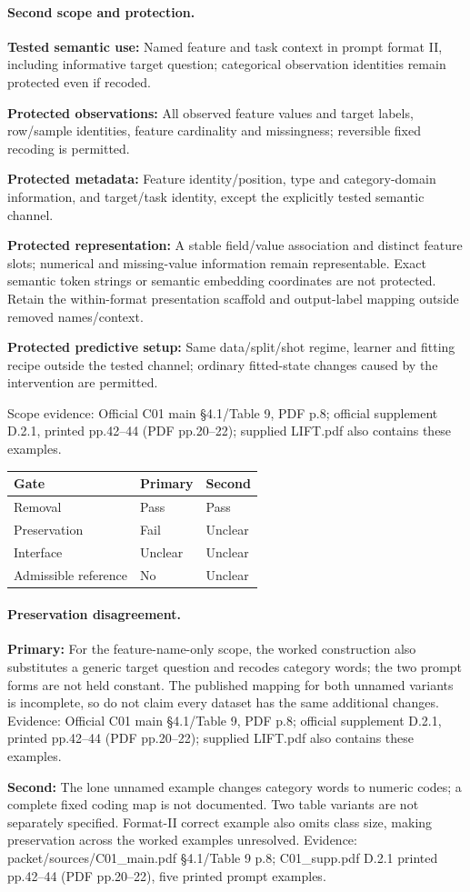 \documentclass[10pt]{article}
\begin{document}
\paragraph{Second scope and protection.}
\textbf{Tested semantic use:} Named feature and task context in prompt format II, including informative target question; categorical observation identities remain protected even if recoded.\par
\textbf{Protected observations:} All observed feature values and target labels, row/sample identities, feature cardinality and missingness; reversible fixed recoding is permitted.\par
\textbf{Protected metadata:} Feature identity/position, type and category-domain information, and target/task identity, except the explicitly tested semantic channel.\par
\textbf{Protected representation:} A stable field/value association and distinct feature slots; numerical and missing-value information remain representable. Exact semantic token strings or semantic embedding coordinates are not protected. Retain the within-format presentation scaffold and output-label mapping outside removed names/context.\par
\textbf{Protected predictive setup:} Same data/split/shot regime, learner and fitting recipe outside the tested channel; ordinary fitted-state changes caused by the intervention are permitted.\par
Scope evidence: Official C01 main §4.1/Table 9, PDF p.8; official supplement D.2.1, printed pp.42--44 (PDF pp.20--22); supplied LIFT.pdf also contains these examples.\par
\begin{tabular}{lll}\toprule Gate & Primary & Second \\ \midrule
Removal & Pass & Pass \\
Preservation & Fail & Unclear \\
Interface & Unclear & Unclear \\
Admissible reference & No & Unclear \\
\bottomrule\end{tabular}
\paragraph{Preservation disagreement.}
\textbf{Primary:} For the feature-name-only scope, the worked construction also substitutes a generic target question and recodes category words; the two prompt forms are not held constant. The published mapping for both unnamed variants is incomplete, so do not claim every dataset has the same additional changes. Evidence: Official C01 main §4.1/Table 9, PDF p.8; official supplement D.2.1, printed pp.42--44 (PDF pp.20--22); supplied LIFT.pdf also contains these examples.\par
\textbf{Second:} The lone unnamed example changes category words to numeric codes; a complete fixed coding map is not documented. Two table variants are not separately specified. Format-II correct example also omits class size, making preservation across the worked examples unresolved. Evidence: packet/sources/C01\_main.pdf §4.1/Table 9 p.8; C01\_supp.pdf D.2.1 printed pp.42--44 (PDF pp.20--22), five printed prompt examples.\par
\end{document}
